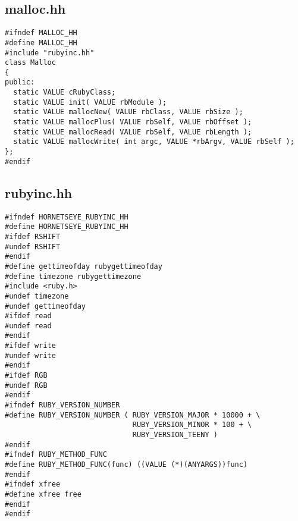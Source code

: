 \subsection{malloc.hh}\label{cha:malloc-hh}
\begin{lstlisting}
#ifndef MALLOC_HH
#define MALLOC_HH
#include "rubyinc.hh"
class Malloc
{
public:
  static VALUE cRubyClass;
  static VALUE init( VALUE rbModule );
  static VALUE mallocNew( VALUE rbClass, VALUE rbSize );
  static VALUE mallocPlus( VALUE rbSelf, VALUE rbOffset );
  static VALUE mallocRead( VALUE rbSelf, VALUE rbLength );
  static VALUE mallocWrite( int argc, VALUE *rbArgv, VALUE rbSelf );
};
#endif
\end{lstlisting}
\subsection{rubyinc.hh}\label{cha:rubyinc-hh}
\begin{lstlisting}
#ifndef HORNETSEYE_RUBYINC_HH
#define HORNETSEYE_RUBYINC_HH
#ifdef RSHIFT
#undef RSHIFT
#endif
#define gettimeofday rubygettimeofday
#define timezone rubygettimezone
#include <ruby.h>
#undef timezone
#undef gettimeofday
#ifdef read
#undef read
#endif
#ifdef write
#undef write
#endif
#ifdef RGB
#undef RGB
#endif
#ifndef RUBY_VERSION_NUMBER
#define RUBY_VERSION_NUMBER ( RUBY_VERSION_MAJOR * 10000 + \
                              RUBY_VERSION_MINOR * 100 + \
                              RUBY_VERSION_TEENY )
#endif
#ifndef RUBY_METHOD_FUNC
#define RUBY_METHOD_FUNC(func) ((VALUE (*)(ANYARGS))func)
#endif
#ifndef xfree
#define xfree free
#endif
#endif
\end{lstlisting}
